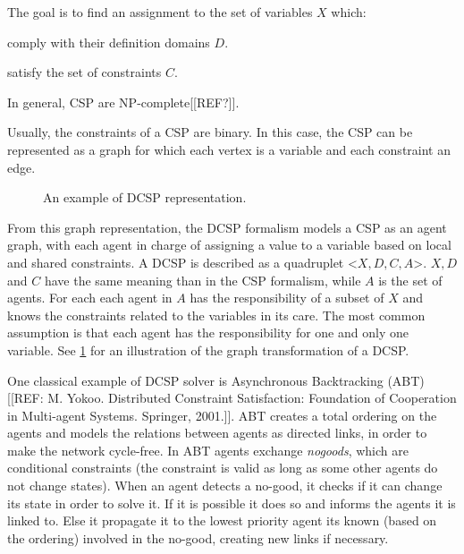 The goal is to find an assignment to the set of variables $X$ which:
\begin{compactitem}
\item comply with their definition domains $D$.
\item satisfy the set of constraints $C$.
\end{compactitem}

In general, CSP are NP-complete[[REF?]].

Usually, the constraints of a CSP are binary. In this case, the CSP can be represented as a graph for which each vertex is a variable and each constraint an edge.

\begin{figure}[]
\centering
{}
\hfill
{}

\caption{An example of DCSP representation.}
\label{dcsp}

\end{figure}

From this graph representation, the DCSP formalism\cite{yokoo1998distributed} models a CSP  as an agent graph, with each agent in charge of assigning a value to a variable based on local and shared constraints. A DCSP is described as a quadruplet <$X, D, C, A$>. $X, D$ and $C$ have the same meaning than in the CSP formalism, while $A$ is the set of agents. For each each agent in $A$ has the responsibility of a subset of $X$ and knows the constraints related to the variables in its care. The most common assumption is that each agent has the responsibility for one and only one variable. See \figurename{} \ref{dcsp} for an illustration of the graph transformation of a DCSP.

One classical example of DCSP solver is Asynchronous Backtracking (ABT)[[REF: M. Yokoo. Distributed Constraint Satisfaction: Foundation of Cooperation in Multi-agent Systems. Springer, 2001.]]. ABT creates a total ordering on the agents and models the relations between agents as directed links, in order to make the network cycle-free. In ABT agents exchange \emph{nogoods}, which are conditional constraints (the constraint is valid as long as some other agents do not change states). When an agent detects a no-good, it checks if it can change its state in order to solve it. If it is possible it does so and informs the agents it is linked to. Else it propagate it to the lowest priority agent its known (based on the ordering) involved in the no-good, creating new links if necessary.

